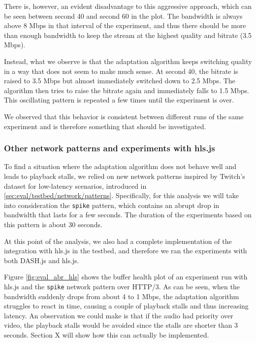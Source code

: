 There is, however, an evident disadvantage to this aggressive approach, which can be seen between second 40 and second 60 in the plot. The bandwidth is always above 8 Mbps in that interval of the experiment, and thus there should be more than enough bandwidth to keep the stream at the highest quality and bitrate (3.5 Mbps).

Instead, what we observe is that the adaptation algorithm keeps switching quality in a way that does not seem to make much sense. At second 40, the bitrate is raised to 3.5 Mbps but almost immediately switched down to 2.5 Mbps. The algorithm then tries to raise the bitrate again and immediately falls to 1.5 Mbps. This oscillating pattern is repeated a few times until the experiment is over.

We observed that this behavior is consistent between different runs of the same experiment and is therefore something that should be investigated.


\subsubsection{Other network patterns and experiments with hls.js}
\label{sec:eval/abr/hls}

To find a situation where the adaptation algorithm does not behave well and leads to playback stalls, we relied on new network patterns inspired by Twitch's dataset for low-latency scenarios, introduced in \ref{sec:eval/testbed/network/patterns}. Specifically, for this analysis we will take into consideration the \texttt{spike} pattern, which contains an abrupt drop in bandwidth that lasts for a few seconds. The duration of the experiments based on this pattern is about 30 seconds.

At this point of the analysis, we also had a complete implementation of the integration with hls.js in the testbed, and therefore we ran the experiments with both DASH.js and hls.js.

Figure \ref{fig:eval_abr_hls} shows the buffer health plot of an experiment run with hls.js and the \texttt{spike} network pattern over HTTP/3. As can be seen, when the bandwidth suddenly drops from about 4 to 1 Mbps, the adaptation algorithm struggles to react in time, causing a couple of playback stalls and thus increasing latency. An observation we could make is that if the audio had priority over video, the playback stalls would be avoided since the stalls are shorter than 3 seconds. Section X will show how this can actually be implemented.

